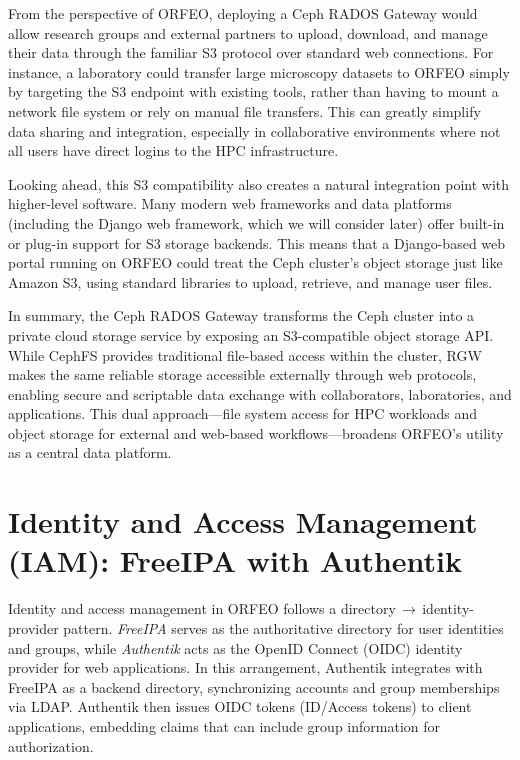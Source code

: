 \medskip

From the perspective of ORFEO, deploying a Ceph RADOS Gateway would allow 
research groups and external partners to upload, download, and manage their data 
through the familiar S3 protocol over standard web connections. For instance, a 
laboratory could transfer large microscopy datasets to ORFEO simply by 
targeting the S3 endpoint with existing tools, rather than having to mount a 
network file system or rely on manual file 
transfers\parencite{Ceph_RGW_S3}. This can greatly simplify data sharing and 
integration, especially in collaborative environments where not all users have 
direct logins to the HPC infrastructure.

\medskip

Looking ahead, this S3 compatibility also creates a natural integration point 
with higher-level software. Many modern web frameworks and data platforms 
(including the Django web framework, which we will consider later) offer 
built-in or plug-in support for S3 storage backends. This means that a 
Django-based web portal running on ORFEO could treat the Ceph cluster’s object 
storage just like Amazon S3, using standard libraries to upload, retrieve, and 
manage user files\parencite{Ceph_RGW_S3,Ceph_RGW_Overview}.

\medskip

In summary, the Ceph RADOS Gateway transforms the Ceph cluster into a private 
cloud storage service by exposing an S3-compatible object storage 
API\parencite{Ceph_RGW_S3,Ceph_RGW_Overview}. While CephFS provides traditional 
file-based access within the cluster, RGW makes the same reliable storage 
accessible externally through web protocols, enabling secure and scriptable data 
exchange with collaborators, laboratories, and applications. This dual 
approach—file system access for HPC workloads and object storage for external 
and web-based workflows—broadens ORFEO’s utility as a central data platform.


\section{Identity and Access Management (IAM): FreeIPA with Authentik}

Identity and access management in ORFEO follows a directory\,$\rightarrow$\,identity-provider pattern. \textit{FreeIPA} serves as the authoritative directory for user identities and groups, while \textit{Authentik} acts as the OpenID Connect (OIDC) identity provider for web applications. In this arrangement, Authentik integrates with FreeIPA as a backend directory, synchronizing accounts and group memberships via LDAP. Authentik then issues OIDC tokens (ID/Access tokens) to client applications, embedding claims that can include group information for authorization\parencite{Authentik_Docs_LDAP,Authentik_Docs_OIDC,FreeIPA_Overview}.

